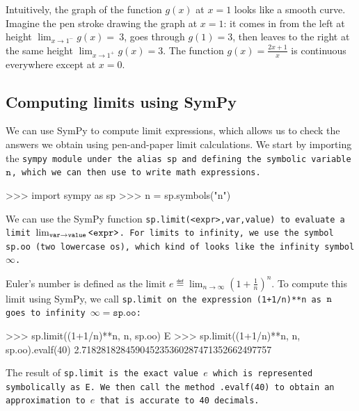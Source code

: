 			Intuitively,
			the graph of the function $g(x)$ at $x=1$ looks like a smooth curve.
			Imagine the pen stroke drawing the graph at $x=1$:
			it comes in from the left at height $\lim_{x\to 1^-} g(x) =~3$,
			goes through $g(1) = 3$,
			then leaves to the right at the same height $\lim_{x\to 1^+} g(x) = 3$.
			The function $g(x)=\frac{2x+1}{x}$ is continuous everywhere except at $x=0$.




	\subsection{Computing limits using SymPy}
	
		We can use SymPy to compute limit expressions,
		which allows us to check the answers we obtain using pen-and-paper limit calculations.
		We start by importing the \tt{sympy} module under the alias \tt{sp}
		and defining the symbolic variable $\tt{n}$,
		which we can then use to write math expressions.

		\begin{codeblock}
		>>> import sympy as sp
		>>> n = sp.symbols("n")
		\end{codeblock}

		We can use the SymPy function \tt{sp.limit(<expr>,var,value)}
		to evaluate a limit $\lim_{\tt{var} \to \tt{value}} \tt{<expr>}$.
		For limits to infinity,
		we use the symbol \texttt{sp.oo} (two lowercase \texttt{o}s),
		which kind of looks like the infinity symbol $\infty$.

		Euler's number is defined as the limit
		$e \eqdef \lim_{n\to \infty} \left( 1 + \frac{1}{n}\right)^{n}$.
		To compute this limit using SymPy,
		we call \tt{sp.limit} on the expression \tt{(1+1/n)**n}
		as $\tt{n}$ goes to infinity $\infty = \texttt{sp.oo}$:

		\begin{codeblock}
		>>> sp.limit((1+1/n)**n, n, sp.oo)
		E
		>>> sp.limit((1+1/n)**n, n, sp.oo).evalf(40)
		2.718281828459045235360287471352662497757
		\end{codeblock}


		\noindent
		The result of \tt{sp.limit} is the exact value $e$
		which is represented symbolically as \tt{E}.
		We then call the method \tt{.evalf(40)} 
		to obtain an approximation to $e$ that is accurate to 40 decimals.

